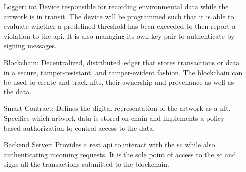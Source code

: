 \begin{itemize}[align=left,font=\itshape]
    \item[Logger:] \gls{iot} Device responsible for recording environmental data while the artwork is in transit. The device will be programmed such that it is able to evaluate whether a predefined threshold has been exceeded to then report a violation to the \gls{api}. It is also managing its own key pair to authenticate by signing messages.
    
    \item[Blockchain:] Decentralized, distributed ledger that stores transactions or data in a secure, tamper-resistant, and tamper-evident fashion. The blockchain can be used to create and track \glspl{nft}, their ownership and provenance as well as the data.
    
    \item[Smart Contract:] Defines the digital representation of the artwork as a \gls{nft}. Specifies which artwork data is stored on-chain and implements a policy-based authorization to control access to the data.
    
    \item[Backend Server:] Provides a \gls{rest} \gls{api} to interact with the \gls{sc} while also authenticating incoming requests. It is the sole point of access to the \gls{sc} and signs all the transactions submitted to the blockchain.
\end{itemize}

